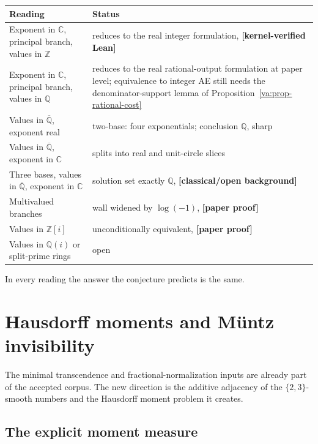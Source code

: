 \documentclass[11pt,oneside]{article}
\theoremstyle{definition}
\theoremstyle{remark}
\newcommand{\Z}{\mathbb Z}
\newcommand{\Q}{\mathbb Q}
\newcommand{\C}{\mathbb C}
\newcommand{\Abar}{\overline{\mathbb Q}}
\newcommand{\Qbar}{\Abar}
\newcommand{\statuslean}{\textcolor{leanblue}{\textbf{[kernel-verified Lean]}}}
\newcommand{\statusnew}{\textcolor{newgreen}{\textbf{[paper proof]}}}
\newcommand{\statusknown}{\textcolor{classicalgray}{\textbf{[classical/open background]}}}
\begin{document}
\begin{center}
\begin{tabular}{p{}p{}}
\toprule
Reading & Status \\
\midrule
Exponent in $\C$, principal branch, values in $\Z$ & reduces to the real integer formulation,
\statuslean \\
Exponent in $\C$, principal branch, values in $\Q$ & reduces to the real rational-output
formulation at paper level; equivalence to integer AE still needs the denominator-support
lemma of Proposition~\ref{va:prop-rational-cost} \\
Values in $\Qbar$, exponent real & two-base: four exponentials; conclusion $\Q$, sharp \\
Values in $\Qbar$, exponent in $\C$ & splits into real and unit-circle slices \\
Three bases, values in $\Qbar$, exponent in $\C$ & solution set exactly $\Q$, \statusknown \\
Multivalued branches & wall widened by $\log(-1)$, \statusnew \\
Values in $\Z[i]$ & unconditionally equivalent, \statusnew \\
Values in $\Q(i)$ or split-prime rings & open \\
\bottomrule
\end{tabular}
\end{center}

In every reading the answer the conjecture predicts is the same.

\section{Hausdorff moments and M\"untz invisibility}
\label{sec:hausdorff-moments}

The minimal transcendence and fractional-normalization inputs are already part of the
accepted corpus.  The new direction is the additive
adjacency of the $\{2,3\}$-smooth numbers and the Hausdorff moment problem it creates.

\subsection{The explicit moment measure}
\label{mom:moments}
\end{document}
